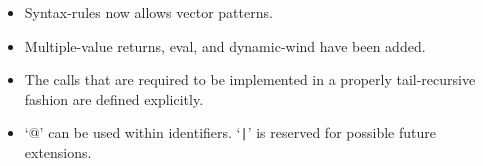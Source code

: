\begin{itemize}
\item {\cf Syntax-rules} now allows vector patterns.

\item Multiple-value returns, {\cf eval}, and {\cf dynamic-wind} have
been added.

\item The calls that are required to be implemented in a properly tail-recursive
fashion are defined explicitly.

\item `{\cf @}' can be used within identifiers. `{\cf \verb"|"}' is reserved
for possible future extensions.

\end{itemize}

%
%
%

